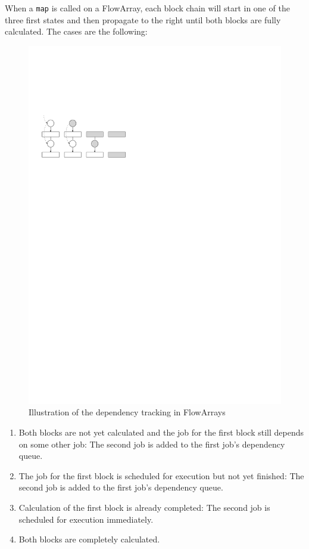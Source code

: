 \documentclass[runningheads,a4paper,fleqn]{llncs}
\begin{document}
When a \texttt{map} is called on a FlowArray, each block chain will
start in one of the three first states and then propagate to the right
until both blocks are fully calculated. The cases are the following:

\begin{figure}
  \centering
  \includegraphics{dependency-tracking}
  \caption{Illustration of the dependency tracking in FlowArrays}
  \label{fig:dep-track}
\end{figure}


\begin{enumerate}
\item Both blocks are not yet calculated and the job for the first
  block still depends on some other job: The second job is added to
  the first job's dependency queue.
\item The job for the first block is scheduled for execution but not
  yet finished: The second job is added to the first job's dependency
  queue.
\item Calculation of the first block is already completed: The second
  job is scheduled for execution immediately.
\item Both blocks are completely calculated.
\end{enumerate}
\end{document}
